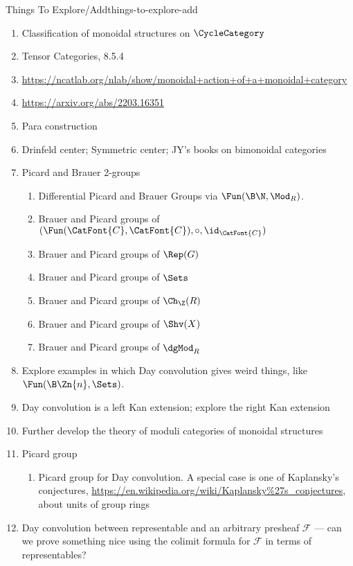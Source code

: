 \begin{remark}{Things To Explore/Add}{things-to-explore-add}
\begin{enumerate}
        \item Classification of monoidal structures on $\CycleCategory$
        \item Tensor Categories, 8.5.4
        \item \url{https://ncatlab.org/nlab/show/monoidal+action+of+a+monoidal+category}
        \item \url{https://arxiv.org/abs/2203.16351}
        \item Para construction
        \item Drinfeld center; Symmetric center; JY's books on bimonoidal categories
        \item Picard and Brauer 2-groups
            \begin{enumerate}
                \item Differential Picard and Brauer Groups via $\Fun(\B\N,\Mod_{R})$.
                \item Brauer and Picard groups of $(\Fun(\CatFont{C},\CatFont{C}),\circ,\id_{\CatFont{C}})$
                \item Brauer and Picard groups of $\Rep(G)$
                \item Brauer and Picard groups of $\Sets$
                \item Brauer and Picard groups of $\Ch_{\Z}(R)$
                \item Brauer and Picard groups of $\Shv(X)$
                \item Brauer and Picard groups of $\dgMod_{R}$
            \end{enumerate}
        \item Explore examples in which Day convolution gives weird things, like $\Fun(\B\Zn{n},\Sets)$.
        \item Day convolution is a left Kan extension; explore the right Kan extension
        \item Further develop the theory of moduli categories of monoidal structures
        \item Picard group
            \begin{enumerate}
                \item Picard group for Day convolution. A special case is one of Kaplansky's conjectures, \url{https://en.wikipedia.org/wiki/Kaplansky\%27s_conjectures}, about units of group rings
            \end{enumerate}
        \item Day convolution between representable and an arbitrary presheaf $\mathcal{F}$ --- can we prove something nice using the colimit formula for $\mathcal{F}$ in terms of representables?

\end{enumerate}
\end{remark}
